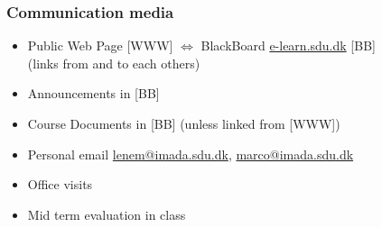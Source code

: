\documentclass[handout,usepdftitle=false,aspectratio=169,smaller,compress,sans,fleqn,xcolor=dvipsnames,fleqn,table]{beamer}
\begin{document}





  \begin{frame}%
    \frametitle{Communication media}
    \medskip\begin{itemize}\itemsep=3ex
    
\item Public Web Page [WWW] $\Leftrightarrow$ BlackBoard \url{e-learn.sdu.dk} [BB]\\
 (links from and to each others)
\item \alert{Announcements} in [BB]
\item \alert{Course Documents} in [BB] (unless linked from [WWW]) 
\item Personal email \url{lenem@imada.sdu.dk}, \url{marco@imada.sdu.dk}
\item Office visits

\medskip

\item \alert{Mid term evaluation} in class
\end{itemize}

\end{frame}
\end{document}
